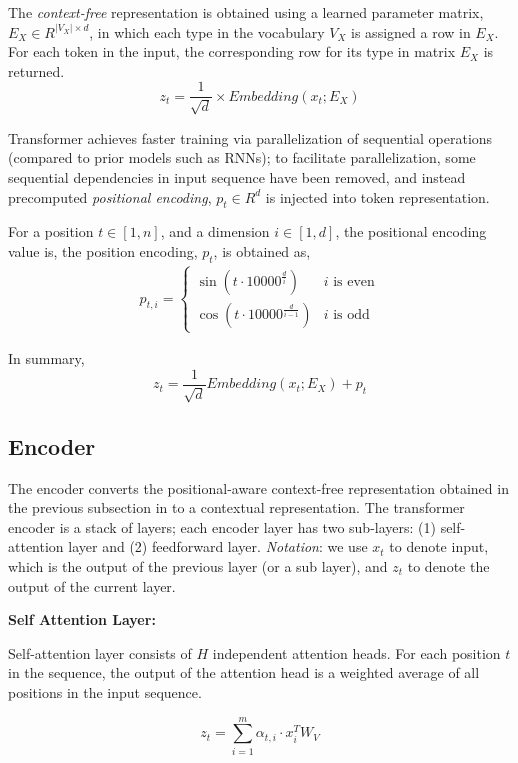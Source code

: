 The \textit{context-free} representation is obtained using a learned parameter matrix, $E_X \in R^{|V_X| \times d}$, in which each type in the vocabulary $V_X$ is assigned a row in $E_X$. 
For each token in the input, the corresponding row for its type in matrix $E_X$ is returned.
$$ z_t =  \frac{1}{\sqrt{d}} \times Embedding(x_t; E_X)$$

Transformer achieves faster training via parallelization of sequential operations (compared to prior models such as RNNs); to facilitate parallelization, some sequential dependencies in input sequence have been removed, and instead precomputed \textit{positional encoding}, $p_t\in R^d$ is injected into token representation.


 For a position $t \in [1,n]$, and a dimension $i \in [1,d]$, the positional encoding value is, the position encoding, $p_t$, is obtained as,
\begin{align}
    p_{t,i} =  \begin{cases}
    \sin(t \cdot 10000^{\frac{d}{i}}) &  i \text{ is even}\\
    \cos(t \cdot 10000^{\frac{d}{i-1}}) & i \text{ is odd}
    \end{cases}
\end{align}

In summary, 
$$z_t = \frac{1}{\sqrt{d}} Embedding(x_t; E_X) + p_t$$



\subsection{Encoder}



The encoder converts the positional-aware context-free representation obtained in the previous subsection in to a contextual representation.
The transformer encoder is a stack of layers;  each encoder layer has two sub-layers: (1) self-attention layer and (2) feedforward layer. 
\textit{Notation}: we use $x_t$ to denote input, which is the output of the previous layer (or a sub layer), and $z_t$ to denote the output of the current layer.

\textbf{Self Attention Layer:}

Self-attention layer consists of $H$ independent attention heads.
For each position $t$ in the sequence, the output of the attention head is a weighted average of all positions in the input sequence.

$$z_{t} = \sum_{i=1}^m \alpha_{t,i} \cdot  x_i^T W_V $$

